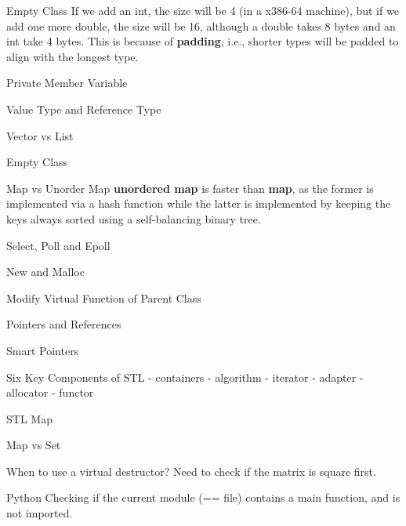 \documentclass[oldfontcommands]{memoir}
\begin{document}
{\begin{answer}{Empty Class}
If we add an int, the size will be 4 (in a x386-64 machine), but if we add one more double, the size will be 16, although a double takes 8 bytes and an int take 4 bytes. This is because of {\bf{padding}}, i.e., shorter types will be padded to align with the longest type.\end{answer}
\begin{answer}{Private Member Variable}
\end{answer}
\begin{answer}{Value Type and Reference Type}
\end{answer}
\begin{answer}{Vector vs List}
\end{answer}
\begin{answer}{Empty Class}
\end{answer}
\begin{answer}{Map vs Unorder Map}
{\bf{unordered map}} is faster than {\bf{map}}, as the former is implemented via a hash function while the latter is implemented by keeping the keys always sorted using a self-balancing binary tree.
\end{answer}
\begin{answer}{Select, Poll and Epoll}
\end{answer}
\begin{answer}{New and Malloc}
\end{answer}
\begin{answer}{Modify Virtual Function of Parent Class}

\end{answer}
\begin{answer}{Pointers and References}

\end{answer}
\begin{answer}{Smart Pointers}

\end{answer}
\begin{answer}{Six Key Components of STL}
- containers
- algorithm
- iterator
- adapter
- allocator
- functor \end{answer}
\begin{answer}{STL Map}
\end{answer}
\begin{answer}{Map vs Set}
\end{answer}
\begin{answer}{When to use a virtual destructor?}
Need to check if the matrix is square first.

\end{answer}
\begin{answer}{Python}
Checking if the current module (== file) contains a main function, and is not imported.\end{answer}
}
\end{document}

